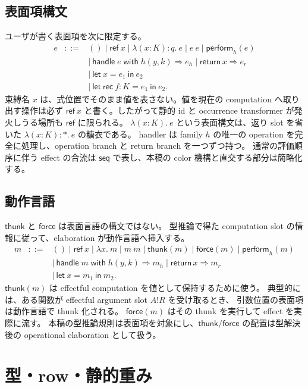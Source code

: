\documentclass[uplatex,dvipdfmx,a4paper,11pt]{jsarticle}
\theoremstyle{jpplain}
\newcommand{\eff}{\mathbin{!}}
\newcommand{\starann}{\ast}
\newcommand{\ret}{\mathsf{return}}
\newcommand{\thunk}{\mathsf{thunk}}
\newcommand{\force}{\mathsf{force}}
\newcommand{\perform}{\mathsf{perform}}
\newcommand{\seqeff}{\mathsf{seq}}
\begin{document}
\subsection{表面項構文}

ユーザが書く表面項を次に限定する。
\[
\begin{array}{rcl}
 e &::=& () \mid \mathsf{ref}\ x \mid \lambda(x:K):q.\ e \mid e\ e \mid \perform_h(e)\\
   && \mid\ \mathsf{handle}\;e\;\mathsf{with}\;h(y,k)\Rightarrow e_h\mid \ret\,x\Rightarrow e_r\\
   && \mid\ \mathsf{let}\ x=e_1\ \mathsf{in}\ e_2\\
   && \mid\ \mathsf{let\ rec}\ f:K=e_1\ \mathsf{in}\ e_2.
\end{array}
\]
束縛名 $x$ は、式位置でそのまま値を表さない。値を現在の computation へ取り出す操作は必ず
\(\mathsf{ref}\ x\) と書く。したがって静的 id と occurrence transformer が発火しうる場所も
\(\mathsf{ref}\) に限られる。
\(\lambda(x:K).\ e\) という表面構文は、返り slot を省いた
\(\lambda(x:K):\starann.\ e\) の糖衣である。
handler は family $h$ の唯一の operation を完全に処理し、operation branch と return branch を一つずつ持つ。
通常の評価順序に伴う effect の合流は $\seqeff$ で表し、本稿の color 機構と直交する部分は簡略化する。

\subsection{動作言語}

\(\thunk\) と \(\force\) は表面言語の構文ではない。
型推論で得た computation slot の情報に従って、elaboration が動作言語へ挿入する。
\[
\begin{array}{rcl}
 m &::=& () \mid \mathsf{ref}\ x \mid \lambda x.\ m \mid m\ m
        \mid \thunk(m) \mid \force(m) \mid \perform_h(m)\\
   && \mid\ \mathsf{handle}\;m\;\mathsf{with}\;h(y,k)\Rightarrow m_h\mid \ret\,x\Rightarrow m_r\\
   && \mid\ \mathsf{let}\ x=m_1\ \mathsf{in}\ m_2.
\end{array}
\]
\(\thunk(m)\) は effectful computation を値として保持するために使う。
典型的には、ある関数が effectful argument slot \(A\eff R\) を受け取るとき、
引数位置の表面項は動作言語で thunk 化される。
\(\force(m)\) はその thunk を実行して effect を実際に流す。
本稿の型推論規則は表面項を対象にし、\(\thunk/\force\) の配置は型解決後の operational elaboration として扱う。

\section{型・row・静的重み}
\end{document}
